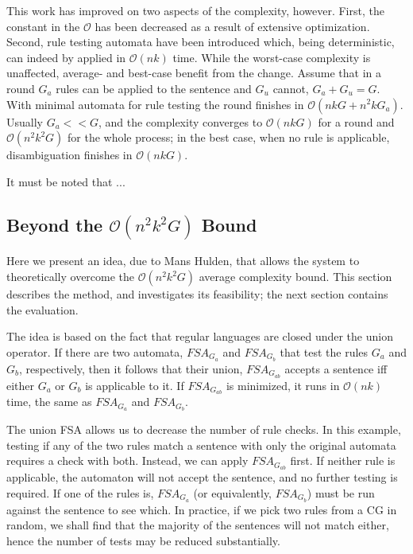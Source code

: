 \documentclass{article}
\begin{document}
This work has improved on two aspects of the complexity, however. First, the
constant in the $\mathcal{O}$ has been decreased as a result of extensive
optimization. Second, rule testing automata have been introduced which, being
deterministic, can indeed by applied in $\mathcal{O}(nk)$ time.
While the worst-case complexity is unaffected, average- and best-case benefit
from the change. Assume that in a round $G_a$ rules can be applied to the
sentence and $G_u$ cannot, $G_a + G_u = G$. With minimal automata for
rule testing the round finishes in $\mathcal{O}(nkG + n^2kG_a)$. Usually
$G_a << G$, and the complexity converges to $\mathcal{O}(nkG)$ for a round
and $\mathcal{O}(n^2k^2G)$ for the whole process; in the best case, when no rule
is applicable, disambiguation finishes in $\mathcal{O}(nkG)$.

It must be noted that ... %


\subsection{Beyond the $\mathcal{O}(n^2k^2G)$ Bound}
\label{sec:idea}

Here we present an idea, due to Mans Hulden, that allows the system to
theoretically overcome the $\mathcal{O}(n^2k^2G)$ average complexity bound.
This section describes the method, and investigates its feasibility; the
next section contains the evaluation.

The idea is based on the fact that regular languages are closed under the union
operator. If there are two automata, $FSA_{G_a}$ and $FSA_{G_b}$ that test the
rules $G_a$ and $G_b$, respectively, then it follows that their union,
$FSA_{G_{ab}}$ accepts a sentence iff either $G_a$ or $G_b$ is applicable to it.
If $FSA_{G_{ab}}$ is minimized, it runs in $\mathcal{O}(nk)$ time, the same as
$FSA_{G_a}$ and $FSA_{G_b}$.

The union FSA allows us to decrease the number of rule checks. In this example,
testing if any of the two rules match a sentence with only the original
automata requires a check with both. Instead, we can apply $FSA_{G_{ab}}$ first.
If neither rule is applicable, the automaton will not accept the sentence, and
no further testing is required. If one of the rules is, $FSA_{G_a}$ (or
equivalently, $FSA_{G_b}$) must be run against the sentence to see which. In
practice, if we pick two rules from a CG in random, we shall find that the
majority of the sentences will not match either, hence the number of tests may
be reduced substantially.
\end{document}
